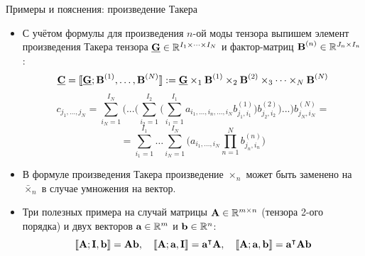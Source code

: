 \begin{frame}{Примеры и пояснения: произведение Такера}

 \vspace{0.2cm}

    \begin{itemize}
        \item С учётом формулы для произведения $n$-ой моды тензора выпишем элемент произведения Такера тензора $\underline{\textbf{G}} \in \mathbb{R}^{I_1\times \dots \times I_N}$ и фактор-матриц $\textbf{B}^{(n)} \in \mathbb{R}^{J_n \times I_n}$:
        $$ \underline{\textbf{C}} = \llbracket \underline{\textbf{G}}; \textbf{B}^{(1)}, \dots, \textbf{B}^{(N)} \rrbracket := \underline{\textbf{G}} \times_1 \textbf{B}^{(1)} \times_2 \textbf{B}^{(2)} \times_3 \dots \times_N \textbf{B}^{(N)} $$
        $$ c_{j_1, \dots , j_N} = \sum_{i_N = 1}^{I_N}\Bigg(  ... \Big(\sum_{i_2 = 1}^{I_2}\big(\sum_{i_1 = 1}^{I_1} a_{i_1, ..., i_n, ..., i_N} b_{j_1,i_1}^{(1)}\big)b^{(2)}_{j_2, i_2}\Big) ... \Bigg)b^{(N)}_{j_N, i_N} = $$
        $$ = \sum_{i_1 = 1}^{I_1} \dots \sum_{i_N = 1}^{I_N} \Bigg( a_{i_1, ..., i_N} \prod_{n=1}^N b^{(n)}_{j_n, i_n} \Bigg) $$
        \item В формуле произведения Такера произведение $\times_n$ может быть заменено на $\bar{\times}_n$ в случае умножения на вектор.
        \item Три полезных примера на случай матрицы $\textbf{A} \in \mathbb{R}^{m \times n}$ (тензора 2-ого порядка) и двух векторов $\textbf{a} \in \mathbb{R}^m$ и $\textbf{b} \in \mathbb{R}^n$:
        $$ \llbracket \textbf{A}; \textbf{I}, \textbf{b} \rrbracket = \textbf{A}\textbf{b}, \quad \llbracket \textbf{A}; \textbf{a}, \textbf{I} \rrbracket = \textbf{a}^\intercal\textbf{A}, \quad \llbracket \textbf{A}; \textbf{a}, \textbf{b} \rrbracket = \textbf{a}^\intercal\textbf{A}\textbf{b} $$
        
    \end{itemize}
    
\end{frame}

